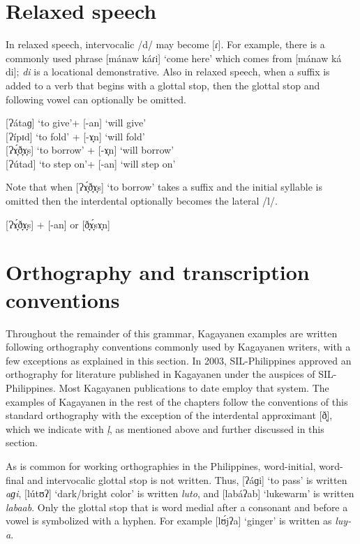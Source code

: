 \newpage
\section{Relaxed speech}
\label{bkm:Ref360478279} 
In relaxed speech, intervocalic /d/ may become [ɾ]. For example, there is a commonly used phrase [mánaw káɾi] ‘come here’ which comes from [mánaw ká di]; \textit{di} is a locational demonstrative. Also in relaxed speech, when a suffix is added to a verb that begins with a glottal stop, then the glottal stop and following vowel can optionally be omitted.


\ea
{}[Ɂátaɡ] ‘to give’+ [-an]  ‘will give’ \\
{}[Ɂípɪd] ‘to fold’ + [-ɤ̞n]  ‘will fold’ \\
{}[Ɂɤ̞́ð̞ɤ̞s] ‘to borrow’ + [-ɤ̞n] \rightarrow [Ɂɤ̞ð̞ɤ̞́sɤ̞n/ð̞ɤ̞́sɤ̞n] ‘will borrow’ \\
{}[Ɂútad] ‘to step on’+ [-an]  ‘will step on’
\z

Note that when [Ɂɤ̞́ð̞ɤ̞s] ‘to borrow’ takes a suffix and the initial syllable is omitted then the interdental optionally becomes the lateral /l/.

\ea
{}[Ɂɤ̞́ð̞ɤ̞s]  + [-an] \rightarrow [lɤ̞́sɤ̞n]  or [ð̞ɤ̞́sɤ̞n]
\z

\section{Orthography and transcription conventions} 
\label{bkm:Ref360478305}
Throughout the remainder of this grammar, Kagayanen examples are written following orthography conventions commonly used by Kagayanen writers, with a few exceptions as explained in this section. In 2003, SIL-Philippines approved an orthography for literature published in Kagayanen under the auspices of SIL-Philippines. Most Kagayanen publications to date employ that system. The examples of Kagayanen in the rest of the chapters follow the conventions of this standard orthography with the exception of the interdental approximant [ð̞], which we indicate with \textit{ļ}, as mentioned above and further discussed in this section.

\hspace*{-1pt}As is common for working orthographies in the Philippines, word-initial, word-final and intervocalic glottal stop is not written. Thus, [ʔáɡi] ‘to pass’ is written \textit{aɡi}, [lútʊʔ] ‘dark/bright color’ is written \textit{luto}, and [labáʔab] ‘lukewarm’ is written \textit{labaab}. Only the glottal stop that is word medial after a consonant and before a vowel is  symbolized with a hyphen. For example [lʊ́jʔa] ‘ginger’ is written as \textit{luy-a}.

